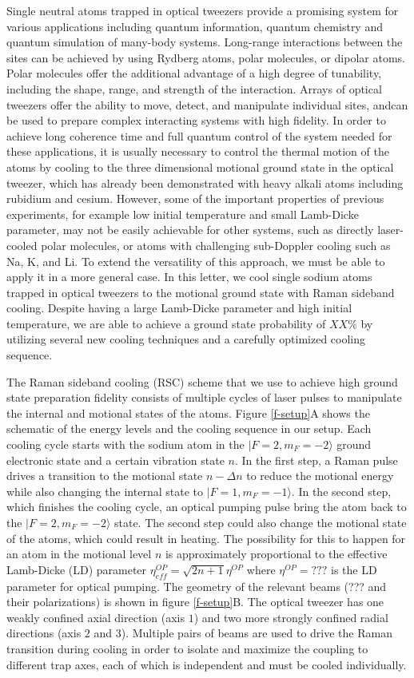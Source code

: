 \documentclass[aps,prl,twocolumn,groupedaddress]{revtex4-1}
\begin{document}
Single neutral atoms trapped in optical tweezers provide a promising system
for various applications including quantum information, quantum chemistry
and quantum simulation of many-body systems.
Long-range interactions between the sites can be achieved by using Rydberg atoms, polar molecules, or dipolar atoms.
Polar molecules offer the additional advantage of a high degree of tunability, including the shape, range, and strength of the interaction.
Arrays of optical tweezers offer the ability to move, detect, and manipulate individual sites, andcan be used to prepare complex interacting systems
with high fidelity.
In order to achieve long coherence time and full quantum control of the system needed for
these applications,
it is usually necessary to control the thermal motion of the atoms by cooling to the
three dimensional motional ground state in the optical tweezer,
which has already been demonstrated with heavy alkali atoms including rubidium and cesium.
However, some of the important properties of previous experiments,
for example low initial temperature and small Lamb-Dicke parameter,
may not be easily achievable for other systems, such as directly laser-cooled polar molecules, or atoms with challenging sub-Doppler cooling such as Na, K, and Li.
To extend the versatility of this approach, we must be able to apply it in a more general case. 
In this letter, we cool single sodium atoms
trapped in optical tweezers to the motional ground state with Raman sideband cooling.
Despite having a large Lamb-Dicke parameter and high initial temperature, we are able to achieve a ground state probability of $XX\%$
by utilizing several new cooling techniques and a carefully optimized cooling sequence.

The Raman sideband cooling (RSC) scheme that we use to achieve high ground state preparation fidelity
consists of multiple cycles of laser pulses to manipulate the internal and
motional states of the atoms.
Figure \ref{f-setup}A shows the schematic of the energy levels and the cooling sequence
in our setup.
Each cooling cycle starts with the sodium atom in the $|F=2, m_F=-2\rangle$
ground electronic state and a certain vibration state $n$.
In the first step, a Raman pulse drives a transition to the motional state $n-\Delta n$
to reduce the motional energy while also changing the internal state to $|F=1, m_F=-1\rangle$.
In the second step, which finishes the cooling cycle,
an optical pumping pulse bring the atom back to the $|F=2, m_F=-2\rangle$ state.
The second step could also change the motional state of the atoms, which
could result in heating. The possibility for this to happen for an atom in the motional level $n$
is approximately proportional to the effective Lamb-Dicke (LD) parameter
$\eta^{OP}_{ef\! f}=\sqrt{2n+1}\eta^{OP}$ where $\eta^{OP}=???$ is the LD parameter for
optical pumping.
The geometry of the relevant beams (??? and their polarizations) is shown in figure \ref{f-setup}B.
The optical tweezer has one weakly confined axial direction (axis $1$) and
two more strongly confined radial directions (axis $2$ and $3$).
Multiple pairs of beams are used to drive the Raman transition during cooling in order to
isolate and maximize the coupling to different trap axes, each of which is independent and must be cooled individually.
\end{document}
